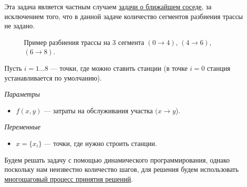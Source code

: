\mathmodel

Эта задача является частным случаем \hyperref[pr:nearest_neighbor_problem]{задачи о ближайшем соседе}, за исключением того, что в данной задаче количество сегментов разбиения трассы не задано.

\begin{figure}[H]
	\centering
	\caption{Пример разбиения трассы на 3 сегмента $(0 \to 4)$, $(4 \to 6)$, $(6 \to 8)$.}
\end{figure}

Пусть $i = 1 \dots 8$ --- точки, где можно ставить станции (в точке $i=0$ станция устанавливается по умолчанию).

\bigskip

\textit{Параметры}

\begin{itemize}[nosep]
	\item $f(x, y)$ --- затраты на обслуживания участка $(x \to y$).
\end{itemize}

\bigskip

\textit{Переменные}

\begin{itemize}[nosep]	
	\item $x = \{x_i\}$ --- точки, где нужно строить станции.
\end{itemize}

\solution

Будем решать задачу с помощью динамического программирования, однако поскольку нам неизвестно количество шагов, для решения будем использовать \hyperref[alg:unknown_step_process]{многошаговый процесс принятия решений}.

